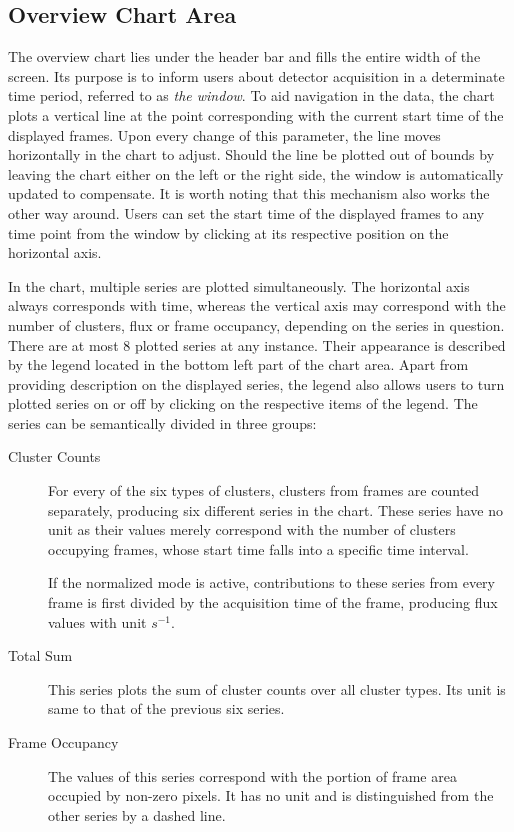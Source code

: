 \subsection{Overview Chart Area}
The overview chart lies under the header bar and fills the entire width of the screen. Its purpose is to inform users about detector acquisition in a determinate time period, referred to as \textit{the window}. To aid navigation in the data, the chart plots a vertical line at the point corresponding with the current start time of the displayed frames. Upon every change of this parameter, the line moves horizontally in the chart to adjust. Should the line be plotted out of bounds by leaving the chart either on the left or the right side, the window is automatically updated to compensate. It is worth noting that this mechanism also works the other way around. Users can set the start time of the displayed frames to any time point from the window by clicking at its respective position on the horizontal axis.

In the chart, multiple series are plotted simultaneously. The horizontal axis always corresponds with time, whereas the vertical axis may correspond with the number of clusters, flux or frame occupancy, depending on the series in question. There are at most 8 plotted series at any instance. Their appearance is described by the legend located in the bottom left part of the chart area. Apart from providing description on the displayed series, the legend also allows users to turn plotted series on or off by clicking on the respective items of the legend. The series can be semantically divided in three groups:

\begin{description}
	\item[Cluster Counts]
	For every of the six types of clusters, clusters from frames are counted separately, producing six different series in the chart. These series have no unit as their values merely correspond with the number of clusters occupying frames, whose start time falls into a specific time interval.

	If the normalized mode is active, contributions to these series from every frame is first divided by the acquisition time of the frame, producing flux values with unit $s^{-1}$.

	\item[Total Sum]
	This series plots the sum of cluster counts over all cluster types. Its unit is same to that of the previous six series.

	\item[Frame Occupancy]
	The values of this series correspond with the portion of frame area occupied by non-zero pixels. It has no unit and is distinguished from the other series by a dashed line. 
\end{description}

